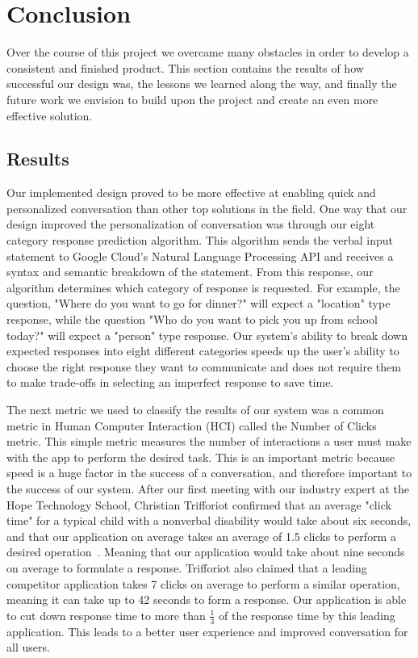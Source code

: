 \chapter{Conclusion}

Over the course of this project we overcame many obstacles in order to develop a consistent and finished product. This section contains the results of how successful our design was, the lessons we learned along the way, and finally the future work we envision to build upon the project and create an even more effective solution.

\section{Results}
Our implemented design proved to be more effective at enabling quick and personalized conversation than other top solutions in the field. One way that our design improved the personalization of conversation was through our eight category response prediction algorithm. This algorithm sends the verbal input statement to Google Cloud's Natural Language Processing API and receives a syntax and semantic breakdown of the statement. From this response, our algorithm determines which category of response is requested. For example, the question, "Where do you want to go for dinner?" will expect a "location" type response, while the question "Who do you want to pick you up from school today?" will expect a "person" type response. Our system's ability to break down expected responses into eight different categories speeds up the user's ability to choose the right response they want to communicate and does not require them to make trade-offs in selecting an imperfect response to save time.

The next metric we used to classify the results of our system was a common metric in Human Computer Interaction (HCI) called the Number of Clicks metric. This simple metric measures the number of interactions a user must make with the app to perform the desired task. This is an important metric because speed is a huge factor in the success of a conversation, and therefore important to the success of our system. After our first meeting with our industry expert at the Hope Technology School, Christian Trifforiot confirmed that an average "click time" for a typical child with a nonverbal disability would take about six seconds, and that our application on average takes an average of 1.5 clicks to perform a desired operation~\cite{trifforiot}. Meaning that our application would take about nine seconds on average to formulate a response. Trifforiot also claimed that a leading competitor application takes 7 clicks on average to perform a similar operation, meaning it can take up to 42 seconds to form a response. Our application is able to cut down response time to more than \(\frac{1}{3}\) of the response time by this leading application. This leads to a better user experience and improved conversation for all users.

